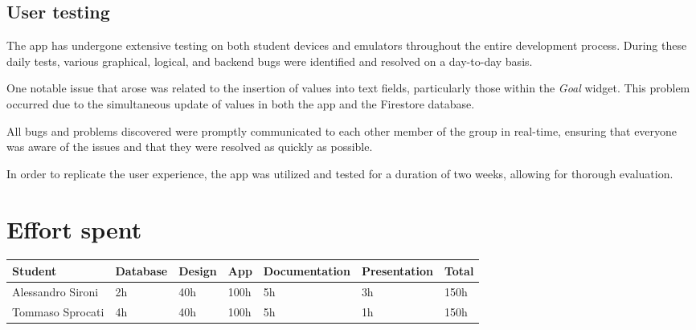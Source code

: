 \documentclass{Configuration_Files/PoliMi3i_thesis}
\begin{document}
\section{User testing}
The app has undergone extensive testing on both student devices and emulators throughout the entire development process. During these daily tests, various graphical, logical, and backend bugs were identified and resolved on a day-to-day basis.

One notable issue that arose was related to the insertion of values into text fields, particularly those within the \textit{Goal} widget. This problem occurred due to the simultaneous update of values in both the app and the Firestore database.

All bugs and problems discovered were promptly communicated to each other member of the group in real-time, ensuring that everyone was aware of the issues and that they were resolved as quickly as possible.

In order to replicate the user experience, the app was utilized and tested for a duration of two weeks, allowing for thorough evaluation.

\chapter{Effort spent}

\begin{table}[h]
\begin{adjustwidth}{-2cm}{}
\begin{tabular}{|m{3.5cm}|m{2cm}|m{1.5cm}|m{1.5cm}|m{3.1cm}|m{3cm}|m{1.5cm}|}
\hline
\textbf{Student} & \textbf{Database} & \textbf{Design} & \textbf{App} & \textbf{Documentation} & \textbf{Presentation} & \textbf{Total} \\
\hline
Alessandro Sironi & 2h & 40h & 100h & 5h & 3h & 150h\\
\hline
Tommaso Sprocati & 4h & 40h & 100h & 5h & 1h & 150h\\
\hline
\end{tabular}
\end{adjustwidth}
\end{table}
\end{document}
